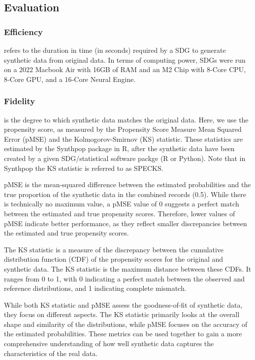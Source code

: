 \documentclass[runningheads]{llncs}
\begin{document}
\subsection{Evaluation}

\subsubsection{Efficiency} refers to the duration in time (in seconds) required by a SDG to generate synthetic data from original data.  In terms of computing power, SDGs were run on a 2022 Macbook Air with 16GB of RAM and an M2 Chip with 8‑Core CPU, 8‑Core GPU, and a 16‑Core Neural Engine.  

\subsubsection{Fidelity} is the degree to which synthetic data matches the original data.  Here, we use the propensity score, as measured by the Propensity Score Measure Mean Squared Error (pMSE) and the Kolmogorov-Smirnov (KS) statistic.  These statistics are estimated by the Synthpop package in R, after the synthetic data have been created by a given SDG/statistical software packge (R or Python).  Note that in Synthpop the KS statistic is referred to as SPECKS.  

pMSE is the mean-squared difference between the estimated probabilities and the true proportion of the synthetic data in the combined records (0.5).  While there is technically no maximum value, a pMSE value of 0 suggests a perfect match between the estimated and true propensity scores.  Therefore, lower values of pMSE indicate better performance, as they reflect smaller discrepancies between the estimated and true propensity scores.  

The KS statistic is a measure of the discrepancy between the cumulative distribution function (CDF) of the propensity scores for the original and synthetic data.  The KS statistic is the maximum distance between these CDFs. It ranges from 0 to 1, with 0 indicating a perfect match between the observed and reference distributions, and 1 indicating complete mismatch.  

While both KS statistic and pMSE assess the goodness-of-fit of synthetic data, they focus on different aspects. The KS statistic primarily looks at the overall shape and similarity of the distributions, while pMSE focuses on the accuracy of the estimated probabilities. These metrics can be used together to gain a more comprehensive understanding of how well synthetic data captures the characteristics of the real data.
\end{document}
